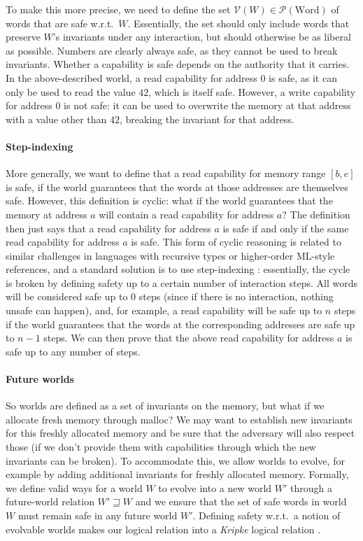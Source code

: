 \documentclass[format=acmsmall, review=true, screen=true]{acmart}
\newcommand{\powerset}[1]{\mathcal{P}(#1)}
\newcommand{\future}{\mathbin{\sqsupseteq}}
\newcommand{\asmType}{\plaindom{AsmType}}
\newcommand{\plaindom}[1]{\mathrm{#1}}
\newcommand{\Words}{\plaindom{Word}}
\newcommand{\intr}[2]{\mathcal{#1}}
\newcommand{\valueintr}[1]{\intr{V}{#1}}
\newcommand{\stdvr}{\valueintr{\asmType}}
\newenvironment{toplas}{}{}
\begin{document}
\begin{toplas}
To make this more precise, we need to define the set $\stdvr(W) \in
\powerset{\Words}$ of words that are safe w.r.t.\ $W$. Essentially, the set
should only include words that preserve $W$'s invariants under any interaction,
but should otherwise be as liberal as possible. Numbers are clearly always safe,
as they cannot be used to break invariants. Whether a capability is safe depends
on the authority that it carries. In the above-described world, a read capability
for address $0$ is safe, as it can only be used to read the value $42$, which is
itself safe. However, a write capability for address $0$ is not safe: it can be
used to overwrite the memory at that address with a value other than $42$,
breaking the invariant for that address.

\paragraph{Step-indexing}
More generally, we want to define that a read capability for memory range
$[b,e]$ is safe, if the world guarantees that the words at those addresses are
themselves safe. However, this definition is cyclic: what if the world
guarantees that the memory at address $a$ will contain a read capability for
address $a$? The definition then just says that a read capability for address
$a$ is safe if and only if the same read capability for address $a$ is safe. This form of
cyclic reasoning is related to similar challenges in languages with recursive
types or higher-order ML-style references, and a standard solution is
to use step-indexing \citep{Appel:2001:IMR:504709.504712}: essentially, the cycle is broken by defining safety up to a
certain number of interaction steps. All words will be considered
safe up to $0$ steps (since if there is no interaction, nothing unsafe
can happen), and, for example, a read capability will be safe up to $n$
steps if the world guarantees that the words at the corresponding addresses are
safe up to $n - 1$ steps. We can then prove that the above read capability for
address $a$ is safe up to any number of steps.

\paragraph{Future worlds}
So worlds are defined as a set of invariants on the memory, but what if we
allocate fresh memory through malloc? We may want to establish new invariants
for this freshly allocated memory and be sure that the adversary will also
respect those (if we don't provide them with capabilities through which the new
invariants can be broken). To accommodate this, we allow worlds to evolve, for
example by adding additional invariants for freshly allocated memory. Formally,
we define valid ways for a world $W$ to evolve into a new world $W'$ through a
future-world relation $W' \future W$ and we ensure that the set of safe words in
world $W$ must remain safe in any future world $W'$. Defining safety w.r.t.\ a
notion of evolvable worlds makes our logical relation into a \emph{Kripke}
logical relation \citep{pitts_operational_1998}.


\end{toplas}
\end{document}
